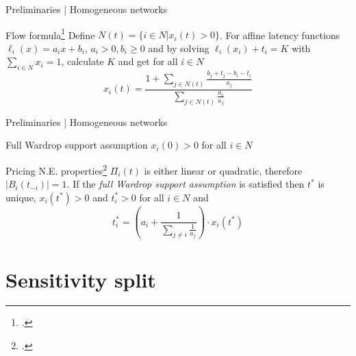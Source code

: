 \documentclass{beamer}
\begin{document}
\begin{frame}{Preliminaries | Homogeneous networks}
	\begin{block}{Flow formula\footcite{Harks_2019}}
		Define $N(t) = \{i \in N | x_i(t) > 0\}$.
		For affine latency functions $\ell_i(x) = a_i x + b_i$, $a_i > 0, b_i \ge 0$ and by solving $\ell_i(x_i) + t_i = K$ with $\sum_{i \in N} x_i = 1$, calculate $K$ and get for all $i \in N$
		\begin{equation*}
			x_i(t) = \frac{1 + \sum_{j \in N(t)}\frac{b_j + t_j - b_i - t_i}{a_j}}{\sum_{j \in N(t)}\frac{a_i}{a_j}}
		\end{equation*}
	\end{block}
\end{frame}

\begin{frame}{Preliminaries | Homogeneous networks}
	\begin{block}{Full Wardrop support assumption}
		$x_i(0) > 0$ for all $i \in N$
	\end{block}
	\begin{block}{Pricing N.E. properties\footcite{Harks_2019}}
		$\Pi_i(t)$ is either linear or quadratic, therefore $|B_i(t_{-i})| = 1$.
		If the \textit{full Wardrop support assumption} is satisfied then $t^*$ is unique, $x_i(t^*) > 0$ and $t_i^* > 0$ for all $i \in N$ and
		\begin{equation*}
			t_i^* = \left(a_i + \frac{1}{\sum_{j \ne i} \frac{1}{a_j}}\right) \cdot x_i(t^*)
		\end{equation*}
	\end{block}
\end{frame}


\section{Sensitivity split}
\end{document}
